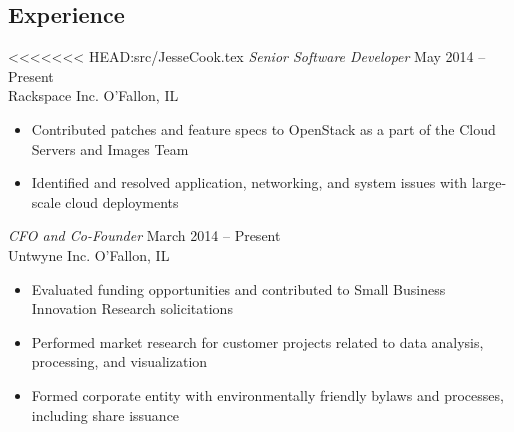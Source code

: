 \documentclass[margin,line]{resume}
\begin{document}
\begin{resume}
\section{Experience}

<<<<<<< HEAD:src/JesseCook.tex
{\sl Senior Software Developer}                                       \hfill May 2014 -- Present\\
Rackspace Inc.                                                        \hfill O'Fallon, IL
\begin{itemize} \itemsep -2pt %
\small\item Contributed patches and feature specs to OpenStack as a part of the Cloud Servers and Images Team
\small\item Identified and resolved application, networking, and system issues with large-scale cloud deployments
\end{itemize}

{\sl CFO and Co-Founder}                                              \hfill March 2014 -- Present\\
Untwyne Inc.                                                          \hfill O'Fallon, IL
\begin{itemize} \itemsep -2pt %
\small\item Evaluated funding opportunities and contributed to Small Business Innovation Research solicitations
\small\item Performed market research for customer projects related to data analysis, processing, and visualization
\small\item Formed corporate entity with environmentally friendly bylaws and processes, including share issuance
\end{itemize}


\end{resume}
\end{document}
